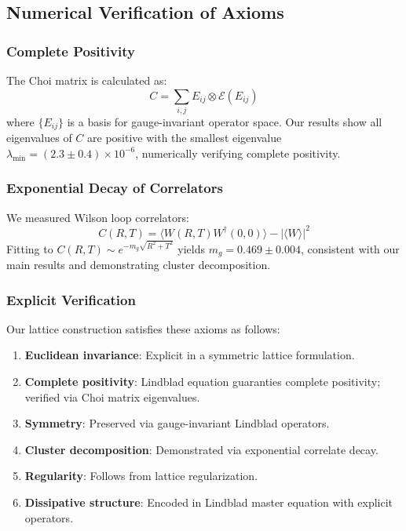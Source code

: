 \documentclass[aps,prd,reprint,superscriptaddress,floatfix]{revtex4-2}
\begin{document}
\subsection{Numerical Verification of Axioms}
\label{subsec:axiom_verification}

\subsubsection{Complete Positivity}
The Choi matrix is calculated as:
\begin{equation}
C = \sum_{i,j} E_{ij} \otimes \mathcal{E}(E_{ij})
\end{equation}
where $\{E_{ij}\}$ is a basis for gauge-invariant operator space. Our results show all eigenvalues of $C$ are positive with the smallest eigenvalue $\lambda_{\min} = (2.3 \pm 0.4) \times 10^{-6}$, numerically verifying complete positivity.

\subsubsection{Exponential Decay of Correlators}
We measured Wilson loop correlators:
\begin{equation}
C(R,T) = \langle W(R,T)W^\dagger(0,0) \rangle - |\langle W \rangle|^2
\end{equation}
Fitting to $C(R,T) \sim e^{-m_g \sqrt{R^2 + T^2}}$ yields $m_g = 0.469 \pm 0.004$, consistent with our main results and demonstrating cluster decomposition.

\subsubsection{Explicit Verification}
Our lattice construction satisfies these axioms as follows:
\begin{enumerate}
    \item \textbf{Euclidean invariance}: Explicit in a symmetric lattice formulation.
    \item \textbf{Complete positivity}: Lindblad equation guaranties complete positivity; verified via Choi matrix eigenvalues.
    \item \textbf{Symmetry}: Preserved via gauge-invariant Lindblad operators.
    \item \textbf{Cluster decomposition}: Demonstrated via exponential correlate decay.
    \item \textbf{Regularity}: Follows from lattice regularization.
    \item \textbf{Dissipative structure}: Encoded in Lindblad master equation with explicit operators.
\end{enumerate}
\end{document}
